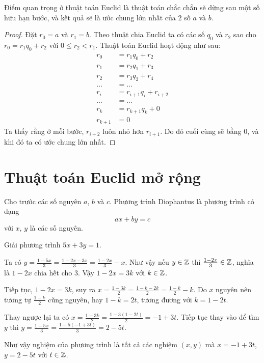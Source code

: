 Điểm quan trọng ở thuật toán Euclid là thuật toán chắc chắn sẽ dừng
sau một số hữu hạn bước, và kết quả sẽ là ước chung lớn nhất của 2
số $a$ và $b$.

\begin{proof}
    Đặt $r_0 = a$ và $r_1 = b$. Theo thuật chia Euclid
    ta có các số $q_0$ và $r_2$ sao cho $r_0 = r_1 q_0 + r_2$ với
    $0 \leq r_2 < r_1$. Thuật toán Euclid hoạt động như sau:
    \begin{align*}
        r_0 & = r_1 q_0 + r_2 \\
        r_1 & = r_2 q_1 + r_3 \\
        r_2 & = r_3 q_2 + r_4 \\
        \ldots & = \ldots \\
        r_i & = r_{i+1} q_i + r_{i+2} \\
        \ldots & = \ldots \\
        r_k & = r_{k+1} q_k + 0 \\
        r_{k+1} & = 0
    \end{align*}
    Ta thấy rằng ở mỗi bước, $r_{i+2}$ luôn nhỏ hơn $r_{i+1}$.
    Do đó cuối cùng sẽ bằng 0, và khi đó ta có ước chung lớn nhất.
\end{proof}

\section{Thuật toán Euclid mở rộng}

\begin{definition}
    Cho trước các số nguyên $a$, $b$ và $c$. Phương trình 
    Diophantus là phương trình có dạng
    \[ax + by = c\]
    với $x$, $y$ là các số nguyên.
\end{definition}

\begin{example}
    Giải phương trình $5x+3y = 1$.

    Ta có $y = \frac{1-5x}{3} = \frac{1-2x-3x}{3} = \frac{1-2x}{3} - x$.
    Như vậy nếu $y \in \mathbb{Z}$ thì $\frac{1-2x}{3} \in \mathbb{Z}$, nghĩa là
    $1-2x$ chia hết cho 3. Vậy $1-2x = 3k$ với $k \in \mathbb{Z}$.

    Tiếp tục, $1-2x = 3k$, suy ra $x = \frac{1-3k}{2} 
    = \frac{1-k-2k}{2} = \frac{1-k}{2} - k$. Do $x$ nguyên nên
    tương tự $\frac{1-k}{2}$ cũng nguyên, hay $1-k = 2t$, tương
    đương với $k = 1-2t$.

    Thay ngược lại ta có $x = \frac{1-3k}{2} = \frac{1-3(1-2t)}{2}
    = {-1+3t}$. Tiếp tục thay vào để tìm $y$ thì $y = \frac{1-5x}{3}
    = \frac{1-5(-1+3t)}{3} = 2 - 5t$.

    Như vậy nghiệm của phương trình là tất cả các nghiệm $(x, y)$
    mà $x = -1+3t$, $y = 2-5t$ với $t \in \mathbb{Z}$.
\end{example}

